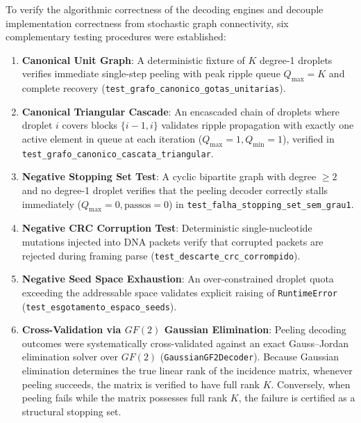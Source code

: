 To verify the algorithmic correctness of the decoding engines and decouple implementation correctness from stochastic graph connectivity, six complementary testing procedures were established:
\begin{enumerate}
    \item \textbf{Canonical Unit Graph}: A deterministic fixture of $K$ degree-1 droplets verifies immediate single-step peeling with peak ripple queue $Q_{\max} = K$ and complete recovery (\texttt{test\_grafo\_canonico\_gotas\_unitarias}).
    \item \textbf{Canonical Triangular Cascade}: An encascaded chain of droplets where droplet $i$ covers blocks $\{i-1, i\}$ validates ripple propagation with exactly one active element in queue at each iteration ($Q_{\max} = 1, Q_{\min} = 1$), verified in \texttt{test\_grafo\_canonico\_cascata\_triangular}.
    \item \textbf{Negative Stopping Set Test}: A cyclic bipartite graph with degree $\ge 2$ and no degree-1 droplet verifies that the peeling decoder correctly stalls immediately ($Q_{\max} = 0, \text{passos} = 0$) in \texttt{test\_falha\_stopping\_set\_sem\_grau1}.
    \item \textbf{Negative CRC Corruption Test}: Deterministic single-nucleotide mutations injected into DNA packets verify that corrupted packets are rejected during framing parse (\texttt{test\_descarte\_crc\_corrompido}).
    \item \textbf{Negative Seed Space Exhaustion}: An over-constrained droplet quota exceeding the addressable space validates explicit raising of \texttt{RuntimeError} (\texttt{test\_esgotamento\_espaco\_seeds}).
    \item \textbf{Cross-Validation via $GF(2)$ Gaussian Elimination}: Peeling decoding outcomes were systematically cross-validated against an exact Gauss--Jordan elimination solver over $GF(2)$ (\texttt{GaussianGF2Decoder}). Because Gaussian elimination determines the true linear rank of the incidence matrix, whenever peeling succeeds, the matrix is verified to have full rank $K$. Conversely, when peeling fails while the matrix possesses full rank $K$, the failure is certified as a structural stopping set.
\end{enumerate}

